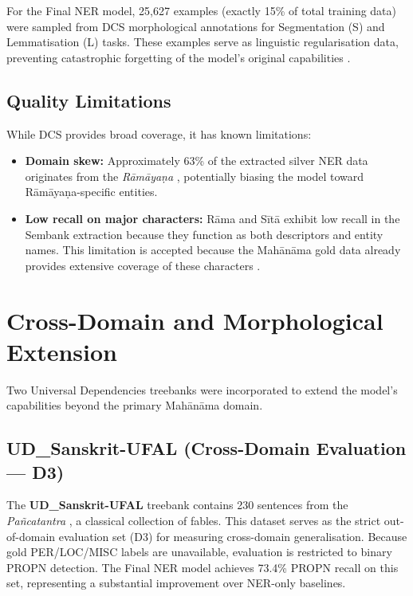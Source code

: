 For the Final NER model, 25,627 examples (exactly 15\% of total training data) were sampled from DCS morphological annotations for Segmentation (S) and Lemmatisation (L) tasks. These examples serve as linguistic regularisation data, preventing catastrophic forgetting of the model's original capabilities \cite{hellwig2020vedictreebank}.

\subsection{Quality Limitations}
\label{subsec:dcs_limitations}

While DCS provides broad coverage, it has known limitations:
\begin{itemize}
    \item \textbf{Domain skew:} Approximately 63\% of the extracted silver NER data originates from the \textit{Rāmāyaṇa} \cite{ramayana}, potentially biasing the model toward Rāmāyaṇa-specific entities.
    \item \textbf{Low recall on major characters:} Rāma and Sītā exhibit low recall in the Sembank extraction because they function as both descriptors and entity names. This limitation is accepted because the Mahānāma gold data already provides extensive coverage of these characters \cite{sarkar2025mahanama}.
\end{itemize}

\section{Cross-Domain and Morphological Extension}
\label{sec:cross_domain}

Two Universal Dependencies treebanks were incorporated to extend the model's capabilities beyond the primary Mahānāma domain.

\subsection{UD\_Sanskrit-UFAL (Cross-Domain Evaluation — D3)}
\label{subsec:ufal}

The \textbf{UD\_Sanskrit-UFAL} treebank \cite{zeman2023ud} contains 230 sentences from the \textit{Pañcatantra} \cite{pancatantra_text}, a classical collection of fables. This dataset serves as the strict out-of-domain evaluation set (D3) for measuring cross-domain generalisation. Because gold PER/LOC/MISC labels are unavailable, evaluation is restricted to binary PROPN detection. The Final NER model achieves 73.4\% PROPN recall on this set, representing a substantial improvement over NER-only baselines.

